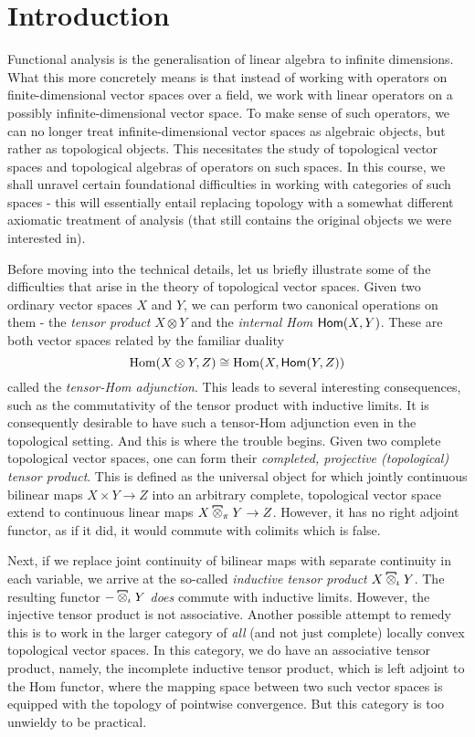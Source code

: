 \chapter*{Introduction}

Functional analysis is the generalisation of linear algebra to infinite dimensions. What this more concretely means is that instead of working with operators on finite-dimensional vector spaces over a field, we work with linear operators on a possibly infinite-dimensional vector space. To make sense of such operators, we can no longer treat infinite-dimensional vector spaces as algebraic objects, but rather as topological objects. This necesitates the study of topological vector spaces and topological algebras of operators on such spaces. In this course, we shall unravel certain foundational difficulties in working with categories of such spaces - this will essentially entail replacing topology with a somewhat different axiomatic treatment of analysis (that still contains the original objects we were interested in). 

Before moving into the technical details, let us briefly illustrate some of the difficulties that arise in the theory of topological vector spaces. Given two ordinary vector spaces \(X\) and \(Y\), we can perform two canonical operations on them - the \emph{tensor product} \(X \otimes Y\) and the \emph{internal Hom} \(\mathsf{Hom}(X,Y)\). These are both vector spaces related by the familiar duality \[\operatorname{Hom}(X \otimes Y, Z) \cong \operatorname{Hom}(X, \mathsf{Hom}(Y,Z))\] called the \textit{tensor-Hom adjunction}. This leads to several interesting consequences, such as the commutativity of the tensor product with inductive limits. It is consequently desirable to have such a tensor-Hom adjunction even in the topological setting. And this is where the trouble begins. Given two complete topological vector spaces, one can form their \emph{completed, projective (topological) tensor product}. This is defined as the universal object for which jointly continuous bilinear maps \(X \times Y \to Z\) into an arbitrary complete, topological vector space  extend to  continuous linear maps \(X \hot_{\pi} Y \to Z\). However, it has no right adjoint functor, as if it did, it would commute with colimits which is false. 

Next, if we replace joint continuity of bilinear maps with separate continuity in each variable, we arrive at the so-called \textit{inductive tensor product} \(X \hot_\iota Y\). The resulting functor \(- \hot_\iota Y\) \emph{does} commute with inductive limits. However, the injective tensor product is not associative. Another possible attempt to remedy this is to work in the larger category of \emph{all} (and not just complete) locally convex topological vector spaces. In this category, we do have an associative tensor product, namely, the incomplete inductive tensor product, which is left adjoint to the Hom functor, where the mapping space between two such vector spaces is equipped with the topology of pointwise convergence. But this category is too unwieldy to be practical. 

